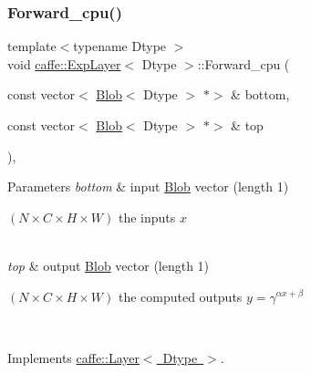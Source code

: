 \mbox{\label{classcaffe_1_1_exp_layer_af623edf2518145ad490baebdda9efe92}} 
\subsubsection{\texorpdfstring{Forward\+\_\+cpu()}{Forward\_cpu()}\hspace{0.1cm}{\footnotesize\ttfamily [2/2]}}
{\footnotesize\ttfamily template$<$typename Dtype $>$ \\
void \mbox{\hyperlink{classcaffe_1_1_exp_layer}{caffe\+::\+Exp\+Layer}}$<$ Dtype $>$\+::Forward\+\_\+cpu (\begin{DoxyParamCaption}\item[{const vector$<$ \mbox{\hyperlink{classcaffe_1_1_blob}{Blob}}$<$ Dtype $>$ $\ast$$>$ \&}]{bottom,  }\item[{const vector$<$ \mbox{\hyperlink{classcaffe_1_1_blob}{Blob}}$<$ Dtype $>$ $\ast$$>$ \&}]{top }\end{DoxyParamCaption})\hspace{0.3cm}{\ttfamily [protected]}, {\ttfamily [virtual]}}


\begin{DoxyParams}{Parameters}
{\em bottom} & input \mbox{\hyperlink{classcaffe_1_1_blob}{Blob}} vector (length 1)
\begin{DoxyEnumerate}
\item $ (N \times C \times H \times W) $ the inputs $ x $ 
\end{DoxyEnumerate}\\
\hline
{\em top} & output \mbox{\hyperlink{classcaffe_1_1_blob}{Blob}} vector (length 1)
\begin{DoxyEnumerate}
\item $ (N \times C \times H \times W) $ the computed outputs $ y = \gamma ^ {\alpha x + \beta} $ 
\end{DoxyEnumerate}\\
\hline
\end{DoxyParams}


Implements \mbox{\hyperlink{classcaffe_1_1_layer_a576ac6a60b1e99fe383831f52a6cea77}{caffe\+::\+Layer$<$ Dtype $>$}}.

\mbox{\label{classcaffe_1_1_exp_layer_a45ec267bdfd48e8aa34490e146405b9e}} 
